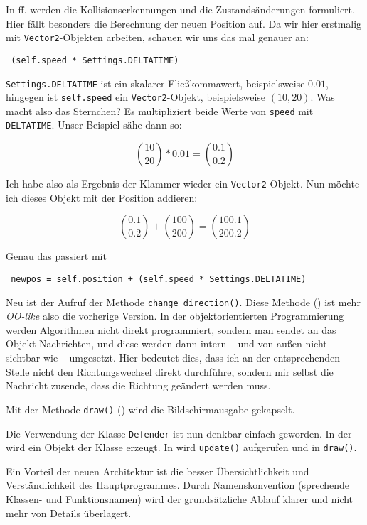 In ff. werden die Kollisionserkennungen und die Zustandsänderungen formuliert. Hier fällt besonders die Berechnung der neuen Position auf. Da wir hier erstmalig mit \texttt{Vector2}-Objekten arbeiten, schauen wir uns das mal genauer an:

\texttt{ (self.speed * Settings.DELTATIME)}

\texttt{Settings.DELTATIME} ist ein skalarer Fließkommawert, beispielsweise $0.01$, hingegen ist \texttt{self.speed} ein \texttt{Vector2}-Objekt, beispielsweise $(10, 20)$. Was macht also das Sternchen? Es multipliziert beide Werte von \texttt{speed} mit \texttt{DELTATIME}. Unser Beispiel sähe dann so:

\[ {10 \choose 20} * 0.01 = {0.1 \choose 0.2} \]

Ich habe also als Ergebnis der Klammer wieder ein \texttt{Vector2}-Objekt. Nun möchte ich dieses Objekt mit der Position addieren:

\[ {0.1 \choose 0.2} + {100 \choose 200} =  {100.1 \choose 200.2}\]

Genau das passiert mit 

\texttt{ newpos = self.position + (self.speed * Settings.DELTATIME)}

Neu ist der Aufruf der Methode \texttt{change\_direction()}. Diese Methode () ist mehr \emph{OO-like} also die vorherige Version. In der objektorientierten Programmierung werden Algorithmen nicht direkt programmiert, sondern man sendet an das Objekt Nachrichten, und diese werden dann intern -- und von außen nicht sichtbar wie -- umgesetzt. Hier bedeutet dies, dass ich an der entsprechenden Stelle nicht den Richtungswechsel direkt durchführe, sondern mir selbst die Nachricht zusende, dass die Richtung geändert werden muss. 

Mit der Methode \texttt{draw()} () wird die Bildschirmausgabe gekapselt.


Die Verwendung der Klasse \texttt{Defender} ist nun denkbar einfach geworden. In der  wird ein Objekt der Klasse erzeugt. In  wird \texttt{update()} aufgerufen und in  \texttt{draw()}.

Ein Vorteil der neuen Architektur ist die besser Übersichtlichkeit und Verständlichkeit des Hauptprogrammes. Durch Namenskonvention (sprechende Klassen- und Funktionsnamen) wird der grundsätzliche Ablauf klarer und nicht mehr von Details überlagert.


